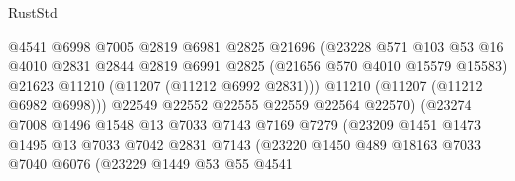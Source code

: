 \begin{lexlean}{RustStd}
\begin{coremodule}
                                    @4541
                                    @6998
                                    @7005
                                    @2819
                                    @6981
                                    @2825
                                    @21696
                                    (@23228
                                      @571
                                      @103
                                      @53
                                      @16
                                      @4010
                                      @2831
                                      @2844
                                      @2819
                                      @6991
                                      @2825
                                      (@21656 @570 @4010 @15579 @15583)
                                      @21623
                                      @11210
                                      (@11207 (@11212 @6992 @2831)))
                                    @11210
                                    (@11207 (@11212 @6982 @6998)))
                                  @22549
                                  @22552
                                  @22555
                                  @22559
                                  @22564
                                  @22570)
                                (@23274
                                  @7008
                                  @1496
                                  @1548
                                  @13
                                  @7033
                                  @7143
                                  @7169
                                  @7279
                                  (@23209
                                    @1451
                                    @1473
                                    @1495
                                    @13
                                    @7033
                                    @7042
                                    @2831
                                    @7143
                                    (@23220
                                      @1450
                                      @489
                                      @18163
                                      @7033
                                      @7040
                                      @6076
                                      (@23229
                                        @1449
                                        @53
                                        @55
                                        @4541

\end{coremodule}
\end{lexlean}
